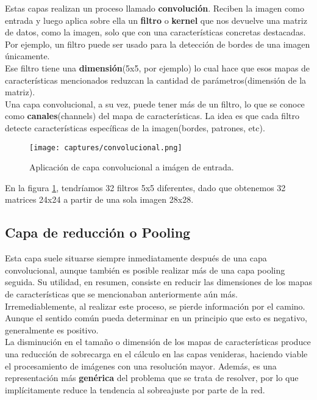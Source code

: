 \documentclass[11pt,fleqn]{book} %
\begin{document}
Estas capas realizan un proceso llamado \textbf{convolución}. Reciben la imagen como entrada y luego aplica sobre ella un \textbf{filtro} o \textbf{kernel} que nos devuelve una matriz de datos, como la imagen, solo que con una características concretas destacadas. Por ejemplo, un filtro puede ser usado para la detección de bordes de una imagen únicamente. \\

Ese filtro tiene una \textbf{dimensión}(5x5, por ejemplo) lo cual hace que esos mapas de características mencionados reduzcan la cantidad de parámetros(dimensión de la matriz).\\

Una capa convolucional, a su vez, puede tener más de un filtro, lo que se conoce como \textbf{canales}(channels) del mapa de características. La idea es que cada filtro detecte características específicas de la imagen(bordes, patrones, etc).

\begin{figure}[H]
	\centering\texttt{[image: captures/convolucional.png]}
	\caption{Aplicación de capa convolucional a imágen de entrada.}
	\label{fig:convolucional} %
\end{figure}

En la figura \ref{fig:convolucional}, tendríamos 32 filtros 5x5 diferentes, dado que obtenemos 32 matrices 24x24 a partir de una sola imagen 28x28.

\subsection{Capa de reducción o Pooling}\label{sec:pooling}

Esta capa suele situarse siempre inmediatamente después de una capa convolucional, aunque también es posible realizar más de una capa pooling seguida. Su utilidad, en resumen, consiste en reducir las dimensiones de los mapas de características que se mencionaban anteriormente aún más. Irremediablemente, al realizar este proceso, se pierde información por el camino. Aunque el sentido común pueda determinar en un principio que esto es negativo, generalmente es positivo. \\

La disminución en el tamaño o dimensión de los mapas de características produce una reducción de sobrecarga en el cálculo en las capas venideras, haciendo viable el procesamiento de imágenes con una resolución mayor. Además, es una representación más \textbf{genérica} del problema que se trata de resolver, por lo que implícitamente reduce la tendencia al sobreajuste por parte de la red. \\
\end{document}
